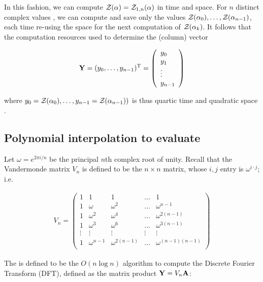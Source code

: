 In this fashion, we can compute ${\mathcal Z}_{}(\alpha)={\mathcal Z}_{1,n}(\alpha)$ in
 time and  space. For $n$ distinct complex values
\alphaN, we can compute and save only the
values ${\mathcal Z}_{}(\alpha_0),\dots,{\mathcal Z}_{}(\alpha_{n-1})$, each time re-using the
 space for the next computation of ${\mathcal Z}_{}(\alpha_k)$. It follows that
the computation resources used to determine the (column) vector

\begin{align}
\label{eq:fftbor:yColumn}
\bfY = (y_0,\dots,y_{n-1})^{\text T} =
\left(
\begin{array}{l}
y_0 \\
y_1 \\
\vdots \\
y_{n-1} \\
\end{array}
\right)
\end{align}

where
$y_0={\mathcal Z}_{}(\alpha_0),\dots,y_{n-1}={\mathcal Z}_{}(\alpha_{n-1}))$ is thus quartic time  and quadratic space .

\subsection{Polynomial interpolation to evaluate
\texorpdfstring{}{}}
\label{subsec:fftbor:fft}

Let $\omega = e^{2 \pi i/n}$ be the principal $n$th complex root of unity.
Recall that the Vandermonde matrix $V_{n}$ is defined to be the
$n \times n$ matrix, whose $i,j$ entry is $\omega^{i \cdot j}$; i.e.

\begin{align}
\label{eq:fftbor:vandermonde}
V_{n} =
\left(
\begin{array}{rrrrr}
1 & 1 & 1 & \dots & 1 \\
1 & \omega & \omega^2 & \dots & \omega^{n-1} \\
1 & \omega^2 & \omega^4 & \dots & \omega^{2(n-1)} \\
1 & \omega^3 & \omega^6 & \dots & \omega^{3(n-1)} \\
\vdots & \vdots & \vdots & \vdots & \vdots \\
1 & \omega^{n-1} & \omega^{2(n-1)} & \dots & \omega^{(n-1)(n-1)} \\
\end{array}
\right)
\end{align}

The \fft is defined to be the $O(n \log n)$
algorithm to compute the Discrete Fourier Transform (DFT), defined
as the matrix product ${\bf Y} = V_{n} {\bf A}$:

